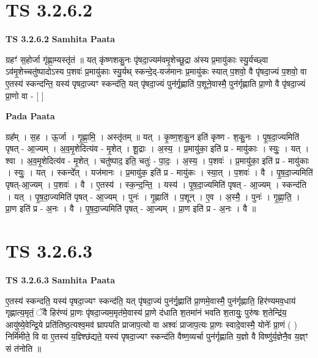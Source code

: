 \documentclass[17pt]{extarticle}
\begin{document}
\section*{ TS 3.2.6.2 }

\textbf{TS 3.2.6.2 } \newline
\textbf{Samhita Paata} \newline

ग्रहꣳ॑ स॒होर्जा गृ॑ह्णा॒म्यस्तृ॑तं ॥ यत् कृ॑ष्णशकु॒नः पृ॑षदा॒ज्यम॑वमृ॒शेच्छू॒द्रा अ॑स्य प्र॒मायु॑काः स्यु॒र्यच्छ्वा ऽव॑मृ॒शेच्चतु॑ष्पादोऽस्य प॒शवः॑ प्र॒मायु॑काः स्यु॒र्यथ् स्कन्दे॒द्-यज॑मानः प्र॒मायु॑कः स्यात् प॒शवो॒ वै पृ॑षदा॒ज्यं प॒शवो॒ वा ए॒तस्य॑ स्कन्दन्ति॒ यस्य॑ पृषदा॒ज्यꣳ स्कन्द॑ति॒ यत् पृ॑षदा॒ज्यं पुन॑र्गृ॒ह्णाति॑ प॒शूने॒वास्मै॒ पुन॑र्गृह्णाति प्रा॒णो वै पृ॑षदा॒ज्यं प्रा॒णो वा - [  ] \newline

\textbf{Pada Paata} \newline

ग्रह᳚म् । स॒ह । ऊ॒र्जा । गृ॒ह्णा॒मि॒ । अस्तृ॑तम् ॥ यत् । कृ॒ष्ण॒श॒कु॒न इति॑ कृष्ण - श॒कु॒नः । पृ॒ष॒दा॒ज्यमिति॑ पृषत् - आ॒ज्यम् । अ॒व॒मृ॒शेदित्य॑व - मृ॒शेत् । शू॒द्राः । अ॒स्य॒ । प्र॒मायु॑का॒ इति॑ प्र - मायु॑काः । स्युः॒ । यत् । श्वा । अ॒व॒मृ॒शेदित्य॑व - मृ॒शेत् । चतु॑ष्पाद॒ इति॒ चतुः॑ - पा॒दः॒ । अ॒स्य॒ । प॒शवः॑ । प्र॒मायु॑का॒ इति॑ प्र - मायु॑काः । स्युः॒ । यत् । स्कन्दे᳚त् । यज॑मानः । प्र॒मायु॑क॒ इति॑ प्र - मायु॑कः । स्या॒त् । प॒शवः॑ । वै । पृ॒ष॒दा॒ज्यमिति॑ पृषत्-आ॒ज्यम् । प॒शवः॑ । वै । ए॒तस्य॑ । स्क॒न्द॒न्ति॒ । यस्य॑ । पृ॒ष॒दा॒ज्यमिति॑ पृषत् - आ॒ज्यम् । स्कन्द॑ति । यत् । पृ॒ष॒दा॒ज्यमिति॑ पृषत् - आ॒ज्यम् । पुनः॑ । गृ॒ह्णाति॑ । प॒शून् । ए॒व । अ॒स्मै॒ । पुनः॑ । गृ॒ह्णा॒ति॒ । प्रा॒ण इति॑ प्र - अ॒नः । वै । पृ॒ष॒दा॒ज्यमिति॑ पृषत् - आ॒ज्यम् । प्रा॒ण इति॑ प्र - अ॒नः । वै ॥  \newline




\section*{ TS 3.2.6.3 }

\textbf{TS 3.2.6.3 } \newline
\textbf{Samhita Paata} \newline

ए॒तस्य॑ स्कन्दति॒ यस्य॑ पृषदा॒ज्यꣳ स्कन्द॑ति॒ यत् पृ॑षदा॒ज्यं पुन॑र्गृ॒ह्णाति॑ प्रा॒णमे॒वास्मै॒ पुन॑र्गृह्णाति॒ हिर॑ण्यमव॒धाय॑ गृह्णात्य॒मृतं॒ ॅवै हिर॑ण्यं प्रा॒णः पृ॑षदा॒ज्यम॒मृत॑मे॒वास्य॑ प्रा॒णे द॑धाति श॒तमा॑नं भवति श॒तायुः॒ पुरु॑षः श॒तेन्द्रि॑य॒ आयु॑ष्ये॒वेन्द्रि॒ये प्रति॑तिष्ठ॒त्यश्व॒मव॑ घ्रापयति प्राजाप॒त्यो वा अश्वः॑ प्राजाप॒त्यः प्रा॒णः स्वादे॒वास्मै॒ योनेः᳚ प्रा॒णं ( ) निर्मि॑मीते॒ वि वा ए॒तस्य॑ य॒ज्ञ्श्छि॑द्यते॒ यस्य॑ पृषदा॒ज्यꣳ स्कन्द॑ति वैष्ण॒व्यर्चा पुन॑र्गृह्णाति य॒ज्ञो वै विष्णु॑र्य॒ज्ञेनै॒व य॒ज्ञ्ꣳ सं त॑नोति ॥ \newline
\end{document}
